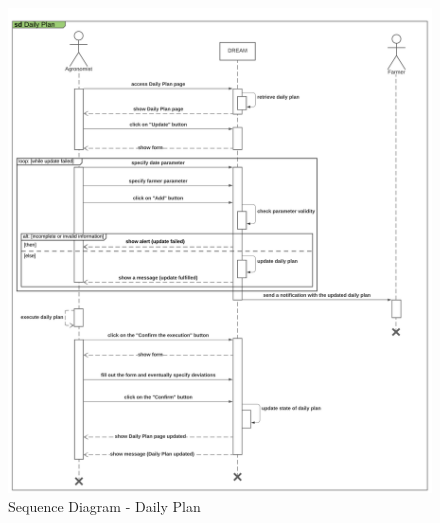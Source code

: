 \begin{center}
    \begin{figure}[H]
  \includegraphics[width=\textwidth,height=\textheight,keepaspectratio]{./Images/Sequence diagram Daily Plan.png}
       \vspace*{-0.7cm}
  \caption{Sequence Diagram - Daily Plan}
\end{figure}
\end{center}

